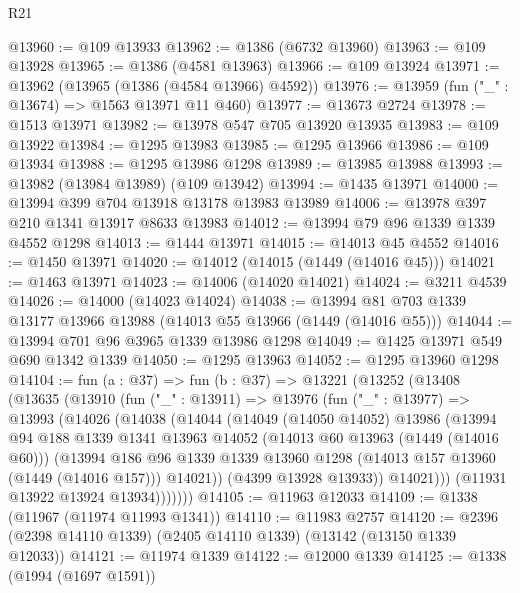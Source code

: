 \begin{lexlean}{R21}
\begin{coremodule}
@13960 := @109 @13933
@13962 := @1386 (@6732 @13960)
@13963 := @109 @13928
@13965 := @1386 (@4581 @13963)
@13966 := @109 @13924
@13971 := @13962 (@13965 (@1386 (@4584 @13966) @4592))
@13976 := @13959 (fun ("_" : @13674) => @1563 @13971 @11 @460)
@13977 := @13673 @2724
@13978 := @1513 @13971
@13982 := @13978 @547 @705 @13920 @13935
@13983 := @109 @13922
@13984 := @1295 @13983
@13985 := @1295 @13966
@13986 := @109 @13934
@13988 := @1295 @13986 @1298
@13989 := @13985 @13988
@13993 := @13982 (@13984 @13989) (@109 @13942)
@13994 := @1435 @13971
@14000 := @13994 @399 @704 @13918 @13178 @13983 @13989
@14006 := @13978 @397 @210 @1341 @13917 @8633 @13983
@14012 := @13994 @79 @96 @1339 @1339 @4552 @1298
@14013 := @1444 @13971
@14015 := @14013 @45 @4552
@14016 := @1450 @13971
@14020 := @14012 (@14015 (@1449 (@14016 @45)))
@14021 := @1463 @13971
@14023 := @14006 (@14020 @14021)
@14024 := @3211 @4539
@14026 := @14000 (@14023 @14024)
@14038 := @13994 @81 @703 @1339 @13177 @13966 @13988 (@14013 @55 @13966 (@1449 (@14016 @55)))
@14044 := @13994 @701 @96 @3965 @1339 @13986 @1298
@14049 := @1425 @13971 @549 @690 @1342 @1339
@14050 := @1295 @13963
@14052 := @1295 @13960 @1298
@14104 := fun (a : @37) =>
  fun (b : @37) =>
  @13221
    (@13252
      (@13408
        (@13635
          (@13910
            (fun ("_" : @13911) =>
            @13976
              (fun ("_" : @13977) =>
              @13993
                (@14026
                  (@14038
                    (@14044
                      (@14049
                        (@14050 @14052)
                        @13986
                        (@13994
                          @94
                          @188
                          @1339
                          @1341
                          @13963
                          @14052
                          (@14013 @60 @13963 (@1449 (@14016 @60)))
                          (@13994
                            @186
                            @96
                            @1339
                            @1339
                            @13960
                            @1298
                            (@14013 @157 @13960 (@1449 (@14016 @157)))
                            @14021))
                        (@4399 @13928 @13933))
                      @14021)))
                (@11931 @13922 @13924 @13934)))))))
@14105 := @11963 @12033
@14109 := @1338 (@11967 (@11974 @11993 @1341))
@14110 := @11983 @2757
@14120 := @2396 (@2398 @14110 @1339) (@2405 @14110 @1339) (@13142 (@13150 @1339 @12033))
@14121 := @11974 @1339
@14122 := @12000 @1339
@14125 := @1338 (@1994 (@1697 @1591))

\end{coremodule}
\end{lexlean}
